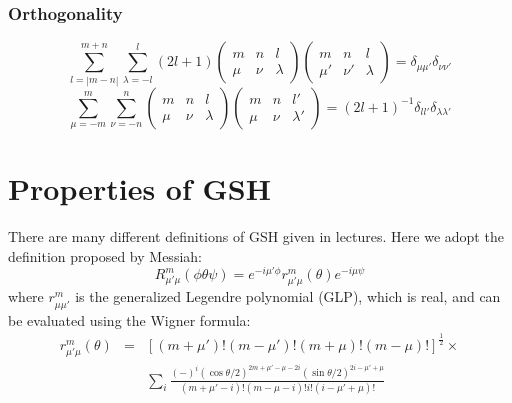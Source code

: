 \subsubsection*{Orthogonality}

\begin{equation}
\sum_{l=\left|m-n\right|}^{m+n}\sum_{\lambda=-l}^{l}\left(2l+1\right)\left(\begin{array}{ccc}
m & n & l\\
\mu & \nu & \lambda
\end{array}\right)\left(\begin{array}{ccc}
m & n & l\\
\mu' & \nu' & \lambda
\end{array}\right)=\delta_{\mu\mu'}\delta_{\nu\nu'}\label{eq:3j-orthogonality}
\end{equation}
\begin{equation}
\sum_{\mu=-m}^{m}\sum_{\nu=-n}^{n}\left(\begin{array}{ccc}
m & n & l\\
\mu & \nu & \lambda
\end{array}\right)\left(\begin{array}{ccc}
m & n & l'\\
\mu & \nu & \lambda'
\end{array}\right)=\left(2l+1\right)^{-1}\delta_{ll'}\delta_{\lambda\lambda'}
\end{equation}


\section{Properties of GSH}

There are many different definitions of \acs{GSH} given in lectures.
Here we adopt the definition proposed by Messiah:
\begin{equation}
R_{\mu'\mu}^{m}(\phi\theta\psi)=e^{-i\mu'\phi}r_{\mu'\mu}^{m}(\theta)e^{-i\mu\psi}\label{eq:GSH-def}
\end{equation}
where $r_{\mu\mu'}^{m}$ is the generalized Legendre polynomial (GLP),
which is real, and can be evaluated using the Wigner formula:
\begin{eqnarray}
r_{\mu'\mu}^{m}(\theta) & = & \left[\left(m+\mu'\right)!\left(m-\mu'\right)!\left(m+\mu\right)!\left(m-\mu\right)!\right]^{\frac{1}{2}}\times\nonumber \\
 &  & \sum_{i}\frac{\left(-\right)^{i}\left(\cos\theta/2\right)^{2m+\mu'-\mu-2i}\left(\sin\theta/2\right)^{2i-\mu'+\mu}}{\left(m+\mu'-i\right)!\left(m-\mu-i\right)!i!\left(i-\mu'+\mu\right)!}
\end{eqnarray}



